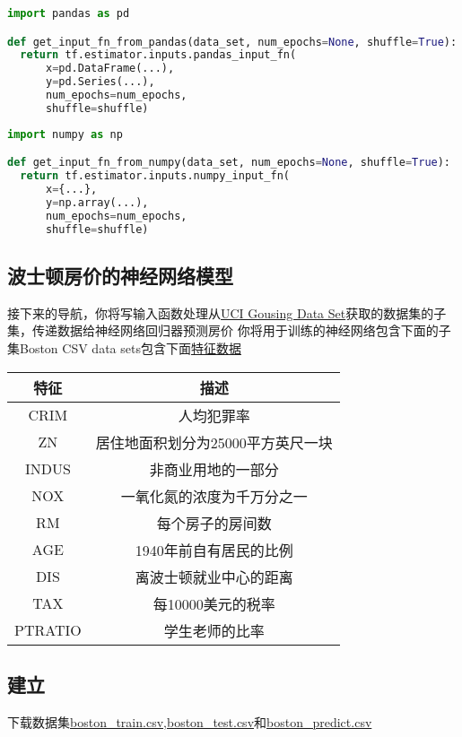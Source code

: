 \begin{lstlisting}[language=Python]
import pandas as pd

def get_input_fn_from_pandas(data_set, num_epochs=None, shuffle=True):
  return tf.estimator.inputs.pandas_input_fn(
      x=pd.DataFrame(...),
      y=pd.Series(...),
      num_epochs=num_epochs,
      shuffle=shuffle)
\end{lstlisting}
\begin{lstlisting}[language=Python]
import numpy as np

def get_input_fn_from_numpy(data_set, num_epochs=None, shuffle=True):
  return tf.estimator.inputs.numpy_input_fn(
      x={...},
      y=np.array(...),
      num_epochs=num_epochs,
      shuffle=shuffle)
\end{lstlisting}
\subsection{波士顿房价的神经网络模型}
接下来的导航，你将写输入函数处理从\href{https://archive.ics.uci.edu/ml/datasets/Housing}{UCI Gousing Data Set}获取的数据集的子集，传递数据给神经网络回归器预测房价
你将用于训练的神经网络包含下面的子集Boston CSV data sets包含下面\href{https://archive.ics.uci.edu/ml/machine-learning-databases/housing/housing.names}{特征数据}\par

\begin{tabular}{|c|c|}
\hline
特征&描述\\
\hline
CRIM&人均犯罪率\\
\hline
ZN&居住地面积划分为25000平方英尺一块\\
\hline
INDUS&非商业用地的一部分\\
\hline
NOX&一氧化氮的浓度为千万分之一\\
\hline
RM&每个房子的房间数\\
\hline
AGE&1940年前自有居民的比例\\
\hline
DIS&离波士顿就业中心的距离\\
\hline
TAX&每10000美元的税率\\
\hline
PTRATIO&学生老师的比率\\
\hline
\end{tabular}
\subsection{建立}
下载数据集\href{https://github.com/bleedingfight/TF_Code/blob/master/boston_price/boston_train.csv}{boston\_train.csv},\href{https://github.com/bleedingfight/TF_Code/blob/master/boston_price/boston_test.csv}{boston\_test.csv}和\href{https://github.com/bleedingfight/TF_Code/blob/master/boston_price/boston_predict.csv}{boston\_predict.csv}
